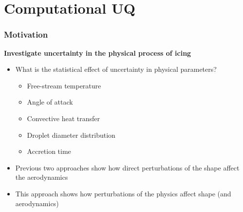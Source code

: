 \documentclass[9pt]{beamer}
\begin{document}
\section{Computational UQ}
\label{sec-3}
\begin{frame}
\frametitle{Motivation}
\label{sec-3-1}

\textbf{Investigate uncertainty in the physical process of icing}
\begin{itemize}
\item What is the statistical effect of uncertainty in physical parameters?
\begin{itemize}
\item Free-stream temperature
\item Angle of attack
\item Convective heat transfer
\item Droplet diameter distribution
\item Accretion time
\end{itemize}
\item Previous two approaches show how direct perturbations of the shape
    affect the aerodynamics
\item This approach shows how perturbations of the physics affect shape
    (and aerodynamics)
\end{itemize}
\end{frame}
\end{document}
